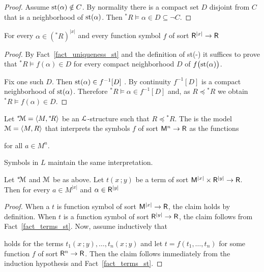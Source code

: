 \documentclass[11pt,oneside]{amsart}
\renewcommand*{\emph}[1]{%
   \smash{\tikz[baseline]\node[rectangle, fill=teal!25, rounded corners, inner xsep=0.5ex, inner ysep=0.2ex, anchor=base, minimum height = 2.7ex]{#1};}}
\begin{document}
\begin{proof}
  Assume ${\rm st}(\alpha)\notin C$.
  By normality there is a compact set $D$ disjoint from $C$ that is a neighborhood of ${\rm st}(\alpha)$.
  Then  ${}^*\!R\models\alpha\in D\subseteq\neg C$.
\end{proof}

\begin{fact}\label{fact_terms_st}
  For every $\alpha\in({}^*\! R)^{|x|}$ and every function symbol $f$ of sort ${\sf R}^{|x|}\to{\sf R}$

\end{fact}

\begin{proof}
  By Fact~\ref{fact_uniqueness_st} and the definition of st(-) it suffices to prove that ${}^*\!R\models f(\alpha)\in D$ for every compact neighborhood $D$ of $f\big({\rm st}(\alpha)\big)$.
  
  Fix one such $D$.
  Then ${\rm st}(\alpha)\in f^{-1}[D]$ .
  By continuity $f^{-1}[D]$ is a compact neighborhood of ${\rm st}(\alpha)$.
  Therefore ${}^*\!R\models \alpha\in f^{-1}[D]$ and, as $R\preceq{}^*\!R$ we obtain ${}^*\!R\models f(\alpha)\in D$.
\end{proof}

Let ${}^*{\!\EuScript M}=\langle M,{}^*\!R\rangle$ be an ${\EuScript L}$-structure such that $R\preceq{}^*\!R$.
The \emph{standard part of ${}^*{\!\EuScript M}$\/} is the model ${\EuScript M}=\langle M,R\rangle$ that interprets the symbols $f$ of sort ${\sf M}^n\to {\sf R}$ as the functions

\hfill for all $a\in M^n$.

Symbols in $L$ maintain the same interpretation.

\begin{fact}\label{fact_st2}
  Let ${}^*{\!\EuScript M}$ and ${\EuScript M}$ be as above.
  Let $t(x\,;y)$ be a term of sort ${\sf M}^{|x|}\times{\sf R}^{|y|}\to {\sf R}$.
  Then for every $a\in M^{|x|}$ and $\alpha\in{\sf R}^{|y|}$

\end{fact}
\begin{proof}
  When a $t$ is function symbol of sort  ${\sf M}^{|x|}\to {\sf R}$, the claim holds by definition.
  When $t$ is a function symbol of sort ${\sf R}^{|y|}\to {\sf R}$, the claim follows from Fact~\ref{fact_terms_st}.
  Now, assume inductively that 


  holds for the terms $t_1(x\,;y),\dots,t_n(x\,;y)$ and let $t=f(t_1,\dots,t_n)$ for some function $f$ of sort ${\sf R}^n\to {\sf R}$.
  Then the claim follows immediately from the induction hypothesis and Fact~\ref{fact_terms_st}.
\end{proof}
\end{document}
